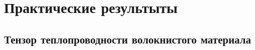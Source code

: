 \chapter{Практические результыты}\label{ch:ch3}

\section{Тензор теплопроводности волокнистого материала}\label{ch:ch3/sect1}


\clearpage
